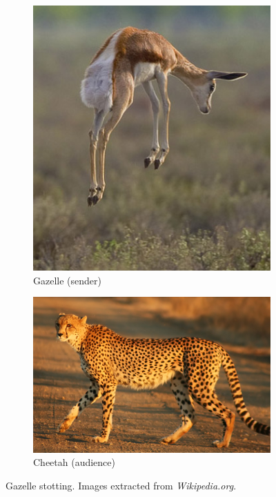 \documentclass[a4paper,12pt]{report}
\begin{document}
\begin{figure}[h]
    \centering
    \begin{subfigure}[b]{0.3\linewidth} 
        \includegraphics[width=\linewidth]{gazelle_wiki}
        \caption{Gazelle (sender)}
    \end{subfigure}\hspace{15mm}
    \begin{subfigure}[b]{0.4\linewidth}
        \includegraphics[width=\linewidth]{cheetah_wiki}
        \caption{Cheetah (audience)}
    \end{subfigure}
    \caption{Gazelle stotting. Images extracted from \emph{Wikipedia.org}.}
    \label{fig:stotting}
    \end{figure}
\end{document}
